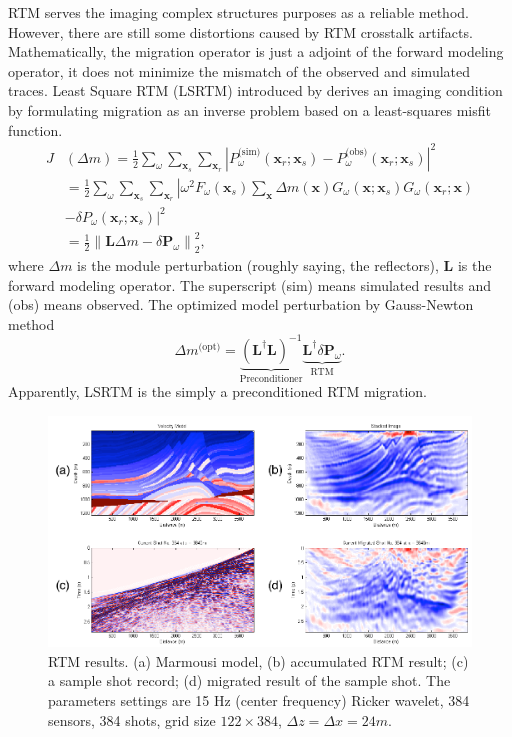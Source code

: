 \documentclass[12pt]{article}
\newcommand{\bx}{\boldsymbol{x}}
\newcommand{\bL}{\boldsymbol{L}}
\newcommand{\bP}{\boldsymbol{P}}
\theoremstyle{plain}
\theoremstyle{definition}
\theoremstyle{remark}
\numberwithin{equation}{section}
\begin{document}
RTM serves the imaging complex structures purposes as a reliable method. However, there are still some distortions caused by RTM crosstalk
artifacts. Mathematically, the migration operator is just a adjoint of the forward modeling operator, it does not minimize the mismatch of the observed and simulated traces. Least Square RTM (LSRTM) introduced by \cite{NemWuAO1999} derives an imaging condition by formulating migration as an inverse problem based on a least-squares misfit function.
  \begin{equation}
  \begin{aligned}
  J&(\Delta m) = \frac{1}{2} \sum\limits_{\omega} \sum\limits_{\bx_s} \sum\limits_{\bx_r} \left| P_{\omega}^{\text{(sim)}}(\bx_r; \bx_s) - P_{\omega}^{\text{(obs)}}(\bx_r; \bx_s) \right|^2 \\
  &= \frac{1}{2} \sum\limits_{\omega} \sum\limits_{\bx_s} \sum\limits_{\bx_r} \left| \omega^2 F_{\omega}(\bx_s) \sum\limits_{\bx}\Delta m(\bx)G_{\omega}(\bx; \bx_s)G_{\omega}(\bx_r; \bx) \right.\\&\left.- \delta P_{\omega}(\bx_r; \bx_s) \right|^2\\
  &= \frac{1}{2} \left\| \bL\Delta m - \delta\bP_{\omega}\right\|_2^2,
  \end{aligned}
  \end{equation}
  where $\Delta m$ is the module perturbation (roughly saying, the reflectors), $\bL$ is the forward modeling operator. The superscript (sim) means simulated results and (obs) means
  observed. The optimized model perturbation by Gauss-Newton method
    \begin{equation}
    \Delta m^{\text{(opt)}} = \underbrace{\left( \bL^{\dag}\bL \right)^{-1}}_{\text{Preconditioner}} \underbrace{\bL^{\dag} \delta\bP_{\omega}}_{\text{RTM}}.
    \end{equation}
    Apparently, LSRTM is the simply a preconditioned RTM migration.  



\begin{figure}
\centering
\includegraphics[width=1\textwidth]{Fig/MarmousiRTM.pdf}
\caption{RTM results. (a) Marmousi model, (b) accumulated RTM result; (c) a sample shot record; (d) migrated result of the sample shot. The parameters settings are 15 Hz (center frequency) Ricker wavelet, 384 sensors, 384 shots, grid size $122 \times 384$, $\Delta z = \Delta x = 24m$.}
\end{figure}
\end{document}
